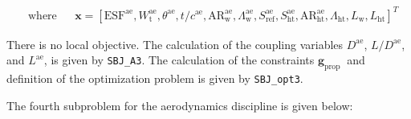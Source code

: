 \documentclass[11pt]{article}
\begin{document}
\begin{equation*}
\begin{aligned}
    & \text{where}
        & & \mathbf{x} = \left[\mathrm{ESF}^{\mathrm{ae}}, W_{\mathrm{t}}^{\mathrm{ae}}, \theta^{\mathrm{ae}}, t / c^{\mathrm{ae}}, \mathrm{AR}_{\mathrm{w}}^{\mathrm{ae}}, \Lambda_{\mathrm{w}}^{\mathrm{ae}}, S_{\mathrm{ref}}^{\mathrm{ae}}, S_{\mathrm{ht}}^{\mathrm{ae}}, \mathrm{AR}_{\mathrm{ht}}^{\mathrm{ae}}, \Lambda_{\mathrm{ht}}, L_{\mathrm{w}}, L_{\mathrm{ht}}\right]^\textit{T}
    \end{aligned}
\end{equation*}

There is no local objective. The calculation of the coupling variables
\(D^{\mathrm{ae}}\), \(L / D^{\mathrm{ae}}\), and \(L^{\mathrm{ae}}\),
is given by \texttt{SBJ\_A3}. The calculation of the constraints
\(\mathbf{g}_{\text {prop }}\) and definition of the optimization
problem is given by \texttt{SBJ\_opt3}.

The fourth subproblem for the aerodynamics discipline is given below:
\end{document}
